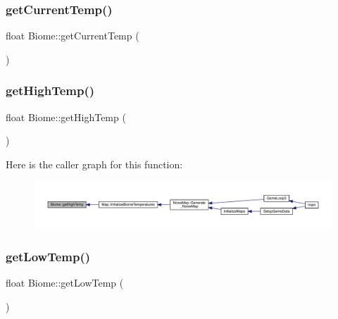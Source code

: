 \mbox{\label{class_biome_ac347b6eeccd189054af58983acd62ea3}} 
\subsubsection{\texorpdfstring{get\+Current\+Temp()}{getCurrentTemp()}}
{\footnotesize\ttfamily float Biome\+::get\+Current\+Temp (\begin{DoxyParamCaption}{ }\end{DoxyParamCaption})}

\mbox{\label{class_biome_afc882c431129cdaae8109ad5dcc8267e}} 
\subsubsection{\texorpdfstring{get\+High\+Temp()}{getHighTemp()}}
{\footnotesize\ttfamily float Biome\+::get\+High\+Temp (\begin{DoxyParamCaption}{ }\end{DoxyParamCaption})}

Here is the caller graph for this function\+:
\nopagebreak
\begin{figure}[H]
\begin{center}
\leavevmode
\includegraphics[width=350pt]{class_biome_afc882c431129cdaae8109ad5dcc8267e_icgraph}
\end{center}
\end{figure}
\mbox{\label{class_biome_a198f0bb873cce52c8e62df2cf0282e84}} 
\subsubsection{\texorpdfstring{get\+Low\+Temp()}{getLowTemp()}}
{\footnotesize\ttfamily float Biome\+::get\+Low\+Temp (\begin{DoxyParamCaption}{ }\end{DoxyParamCaption})}

